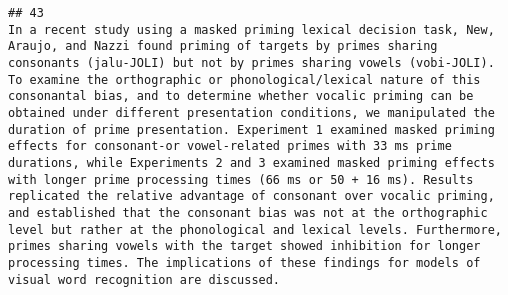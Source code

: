 \documentclass[
  english,
  man]{apa6}
\begin{document}
\begin{verbatim}
## 43                                                                                                                                                                                                                                                                                                                                                                                                                                                                                                                                                                                                                                                                                                                                                                                                                                                                                                                                                                                                                                                                                                                                                                                                                                                                                                                                                                                                                                                                                                                                                                                   In a recent study using a masked priming lexical decision task, New, Araujo, and Nazzi found priming of targets by primes sharing consonants (jalu-JOLI) but not by primes sharing vowels (vobi-JOLI). To examine the orthographic or phonological/lexical nature of this consonantal bias, and to determine whether vocalic priming can be obtained under different presentation conditions, we manipulated the duration of prime presentation. Experiment 1 examined masked priming effects for consonant-or vowel-related primes with 33 ms prime durations, while Experiments 2 and 3 examined masked priming effects with longer prime processing times (66 ms or 50 + 16 ms). Results replicated the relative advantage of consonant over vocalic priming, and established that the consonant bias was not at the orthographic level but rather at the phonological and lexical levels. Furthermore, primes sharing vowels with the target showed inhibition for longer processing times. The implications of these findings for models of visual word recognition are discussed.

\end{verbatim}
\end{document}

